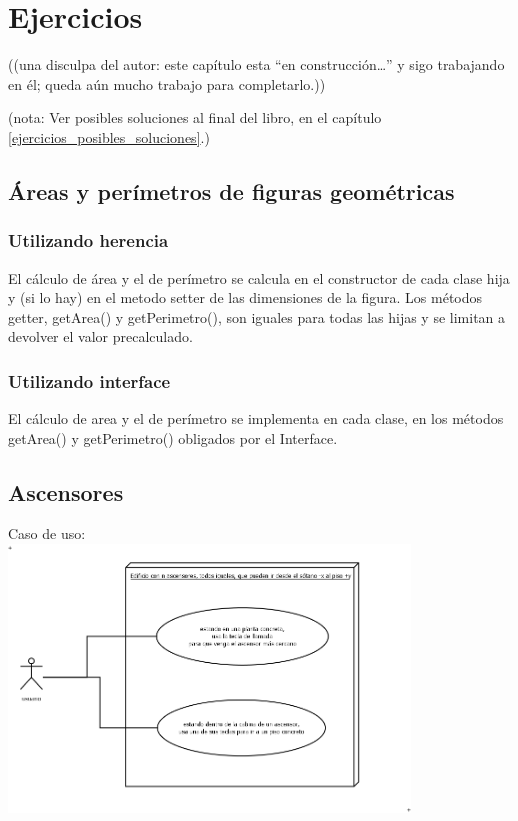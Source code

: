 \documentclass[spanish,12pt,a4paper,final,oneside]{book}
\begin{document}
\chapter{Ejercicios}\label{ejercicios_oop}

\begin{footnotesize}((una disculpa del autor: este capítulo esta ``en construcción\ldots'' y sigo trabajando en él; queda aún mucho trabajo para completarlo.))\end{footnotesize}


(nota: Ver posibles soluciones al final del libro, en el capítulo \ref{ejercicios_posibles_soluciones}.)\\

\section{Áreas y perímetros de figuras geométricas}
\subsection{Utilizando herencia}
El cálculo de área y el de perímetro se calcula en el constructor de cada clase hija y (si lo hay) en el metodo setter de las dimensiones de la figura. Los métodos getter, getArea() y getPerimetro(), son iguales para todas las hijas y se limitan a devolver el valor precalculado.
\subsection{Utilizando interface}
El cálculo de area y el de perímetro se implementa en cada clase, en los métodos getArea() y getPerimetro() obligados por el Interface.


\section{Ascensores}\label{ejercicio_ascensores}

Caso de uso:
\\ \includegraphics[width=0.8\textwidth]{ascensores - caso de uso} 
\end{document}
